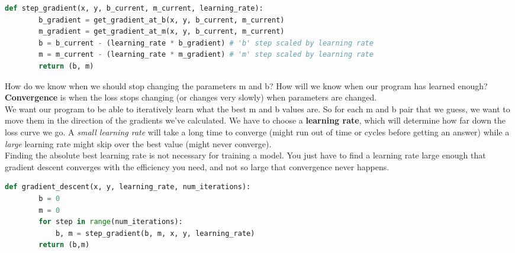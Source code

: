 \documentclass[11pt, a4paper]{article}
\begin{document}
\begin{spacing}{1.1}
	\begin{lstlisting}[language=Python]
	def step_gradient(x, y, b_current, m_current, learning_rate):
		b_gradient = get_gradient_at_b(x, y, b_current, m_current) 
		m_gradient = get_gradient_at_m(x, y, b_current, m_current)
		b = b_current - (learning_rate * b_gradient) # 'b' step scaled by learning rate
		m = m_current - (learning_rate * m_gradient) # 'm' step scaled by learning rate
		return (b, m) \end{lstlisting}\vspace*{1mm}
	How do we know when we should stop changing the parameters m and b? How will we know when our program has learned enough? \textbf{Convergence} is when the loss stops changing (or changes very slowly) when parameters are changed. \vspace*{2mm} \\
	We want our program to be able to iteratively learn what the best m and b values are. So for each m and b pair that we guess, we want to move them in the direction of the gradients we’ve calculated. We have to choose a \textbf{learning rate}, which will determine how far down the loss curve we go. A \textit{small learning rate} will take a long time to converge (might run out of time or cycles before getting an answer) while a \textit{large} learning rate might skip over the best value (might never converge). \vspace*{1mm} \\
	Finding the absolute best learning rate is not necessary for training a model. You just have to find a learning rate large enough that gradient descent converges with the efficiency you need, and not so large that convergence never happens. \vspace*{1mm}
	\begin{lstlisting}[language=Python]
	def gradient_descent(x, y, learning_rate, num_iterations):
		b = 0
		m = 0
		for step in range(num_iterations):
			b, m = step_gradient(b, m, x, y, learning_rate)
		return (b,m) 
	

\end{lstlisting}
\end{spacing}
\end{document}
